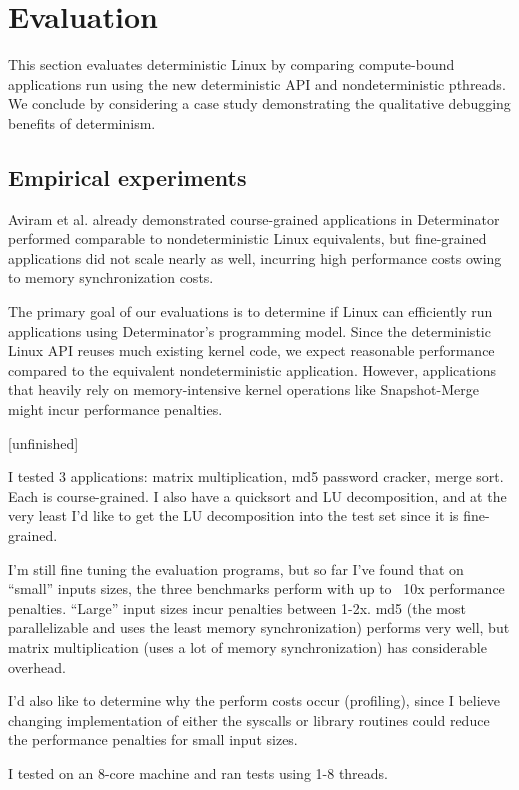 
\section{Evaluation}

This section evaluates deterministic Linux by comparing compute-bound
applications run using the new deterministic API and nondeterministic pthreads.
We conclude by considering a case study demonstrating the qualitative debugging
benefits of determinism.

\subsection{Empirical experiments}

Aviram et al. already demonstrated course-grained applications in Determinator
performed comparable to nondeterministic Linux equivalents, but fine-grained
applications did not scale nearly as well, incurring high performance costs
owing to memory synchronization costs.

The primary goal of our evaluations is to determine if Linux can efficiently run
applications using Determinator's programming model. Since the
deterministic Linux API reuses much existing kernel code, we expect reasonable
performance compared to the equivalent nondeterministic application. However,
applications that heavily rely on memory-intensive kernel operations like
Snapshot-Merge might incur performance penalties.

[unfinished]

I tested 3 applications: matrix multiplication, md5 password cracker, merge
sort. Each is course-grained.
I also have a quicksort and LU decomposition, and at the very least I'd like to get
the LU decomposition into the test set since it is fine-grained.

I'm still fine tuning the evaluation programs, but so far I've found that
on ``small'' inputs sizes, the three benchmarks perform with up to ~10x
performance penalties. ``Large'' input sizes incur penalties between 1-2x.
md5 (the most parallelizable and uses the least memory synchronization)
performs very well, but matrix multiplication (uses a lot of memory
synchronization) has considerable overhead.

I'd also like to determine why the perform costs occur (profiling), since I
believe changing implementation of either the syscalls or library routines could
reduce the performance penalties for small input sizes.

I tested on an 8-core machine and ran tests using 1-8 threads.

